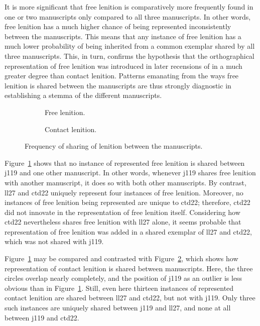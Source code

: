 It is more significant that free lenition is comparatively more frequently found in one or two manuscripts only compared to all three manuscripts. In other words, free lenition has a much higher chance of being represented inconsistently between the manuscripts. This means that any instance of free lenition has a much lower probability of being inherited from a common exemplar shared by all three manuscripts. This, in turn, confirms the hypothesis that the orthographical representation of free lenition was introduced in later recensions of  in a much greater degree than contact lenition. Patterns  emanating from the ways free lenition is shared between the manuscripts are thus strongly diagnostic in establishing a stemma of the different manuscripts.

\begin{figure}[h]
  \begin{subfigure}[b]{0.5\linewidth}
    \centering
    
    \caption{Free lenition.}
    \label{fig:vennfreelendewi}
  \end{subfigure}%
  \begin{subfigure}[b]{0.5\linewidth}
    \centering
    
    \caption{Contact lenition.}
    \label{fig:venncontlendewi}
  \end{subfigure}
  \caption{Frequency of sharing of lenition between  the manuscripts.}
  \label{fig:vennlendewi}
\end{figure}
Figure~\ref{fig:vennfreelendewi} shows that no instance of represented free lenition  is shared between \gls{j119} and one other manuscript. In other words, whenever \gls{j119} shares free lenition with another manuscript, it does so with both other manuscripts. By contrast, \gls{ll27} and \gls{ctd22} uniquely represent four instances of free lenition. Moreover, no instances of free lenition being represented are unique to \gls{ctd22}; therefore, \gls{ctd22} did not innovate in the representation of free lenition itself. Considering how \gls{ctd22} nevertheless shares free lenition with \gls{ll27} alone, it seems probable that representation of free lenition was added in a shared exemplar of \gls{ll27} and \gls{ctd22}, which was not shared with \gls{j119}.


Figure~\ref{fig:vennfreelendewi} may be compared and contrasted with Figure~\ref{fig:venncontlendewi}, which shows how representation of contact lenition is shared between manuscripts. Here, the three circles overlap nearly completely, and the position of \gls{j119} as an outlier is less obvious than in Figure~\ref{fig:vennfreelendewi}. Still, even here  thirteen instances of represented contact lenition are shared between \gls{ll27} and \gls{ctd22}, but not with \gls{j119}. Only three such instances are uniquely  shared between \gls{j119} and \gls{ll27}, and none at all between \gls{j119} and \gls{ctd22}.

